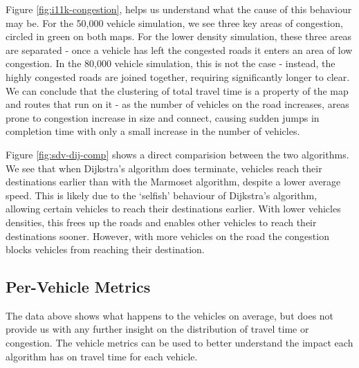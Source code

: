 \documentclass[ %
                    author={Alexander Hill},
                supervisor={Dr. Benjamin Sach},
                    degree={MEng},
                     title={MARMOSET},
                  subtitle={Multi-Agent Route Management using Online Simulation for Efficient Transportation},
                      type={research},
                      year={2016} ]{dissertation}
\begin{document}
Figure \ref{fig:i11k-congestion}, helps us understand what the cause of this
behaviour may be. For the 50,000 vehicle simulation, we see three key areas of
congestion, circled in green on both maps. For the lower density simulation,
these three areas are separated - once a vehicle has left the congested roads it
enters an area of low congestion. In the 80,000 vehicle simulation, this is not
the case - instead, the highly congested roads are joined together, requiring
significantly longer to clear.  We can conclude that the clustering of total
travel time is a property of the map and routes that run on it - as the number
of vehicles on the road increases, areas prone to congestion increase in size
and connect, causing sudden jumps in completion time with only a small increase
in the number of vehicles.

Figure \ref{fig:sdv-dij-comp} shows a direct comparision between the two
algorithms. We see that when Dijkstra's algorithm does terminate, vehicles reach
their destinations earlier than with the Marmoset algorithm, despite a lower
average speed. This is likely due to the `selfish' behaviour of Dijkstra's
algorithm, allowing certain vehicles to reach their destinations earlier. With
lower vehicles densities, this frees up the roads and enables other vehicles to
reach their destinations sooner. However, with more vehicles on the road the
congestion blocks vehicles from reaching their destination.

\subsection{Per-Vehicle Metrics}

The data above shows what happens to the vehicles on average, but does not
provide us with any further insight on the distribution of travel time or
congestion. The vehicle metrics can be used to better understand the impact
each algorithm has on travel time for each vehicle.
\end{document}
